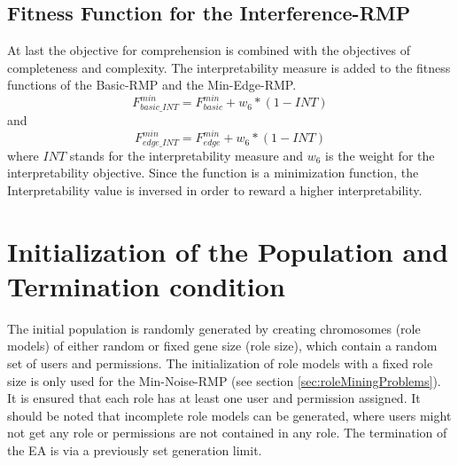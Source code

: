         \subsection{Fitness Function for the Interference-RMP}
        At last the objective for comprehension is combined with the objectives of completeness and complexity. The interpretability measure is added to the fitness functions of the Basic-RMP and the Min-Edge-RMP.        
        \begin{equation}\label{eq:FBasicMin_INT}
	        F_{basic\_INT}^{min} = F_{basic}^{min} + w_6 * (1-INT)
	    \end{equation}	    
	    and	    
	    \begin{equation}\label{eq:FEdgeMin_INT}
		    F_{edge\_INT}^{min} = F_{edge}^{min} + w_6 * (1-INT)
		\end{equation}		
		where $INT$ stands for the interpretability measure and $w_6$ is the weight for the interpretability objective. Since the function is a minimization function, the Interpretability value is inversed in order to reward a higher interpretability.
    
    \section{Initialization of the Population and Termination condition}
    The initial population is randomly generated by creating chromosomes (role models) of either random or fixed gene size (role size), which contain a random set of users and permissions. The initialization of role models with a fixed role size is only used for the Min-Noise-RMP (see section \ref{sec:roleMiningProblems}).
    It is ensured that each role has at least one user and permission assigned. It should be noted that incomplete role models can be generated, where users might not get any role or permissions are not contained in any role.
    The termination of the EA is via a previously set generation limit.
    
